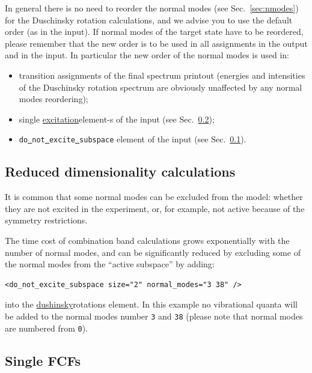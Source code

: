 \documentclass[11pt]{article}
\begin{document}
In general there is no need to reorder the normal modes (see Sec.~\ref{sec:nmodes}) 
for the Duschinsky rotation calculations, 
and we advise you to use the default order (as in the \ai input).
If normal modes of the target state have to be reordered,
please remember that the new order is to be used in all assignments in the output 
and in the input.
In particular the new order of the normal modes is used in:
\begin{itemize}
\item transition assignments of the final spectrum printout (energies and intensities of the 
Duschinsky rotation spectrum are obviously unaffected by any normal modes reordering);
\item single \ul{excitation}{element}-s of the input (see Sec.~\ref{sec:dush:single_ex});
\item {\tt do\underline{~}not\underline{~}excite\underline{~}subspace} element of the input (see Sec.~\ref{sec:dush:subspace}).
\end{itemize}



\subsection{Reduced dimensionality calculations}
\label{sec:dush:subspace}

It is common that some normal modes can be excluded from the model: whether they are not excited in the experiment,
or, for example, not active because of the symmetry restrictions. 

The time cost of combination band calculations grows exponentially with the number of normal modes, 
and can be significantly reduced by excluding some of the normal modes from the ``active subspace'' 
by adding:
\begin{lstlisting}[frame=single,framerule=0pt]
   <do_not_excite_subspace size="2" normal_modes="3 38" />
\end{lstlisting}
into the \ul{dushinsky}{rotations} element. In this example no vibrational quanta will be added to 
the normal modes number {\tt 3} and {\tt 38} (please note that normal modes are numbered from {\tt 0}).

\subsection{Single FCFs}
\label{sec:dush:single_ex}
\end{document}
